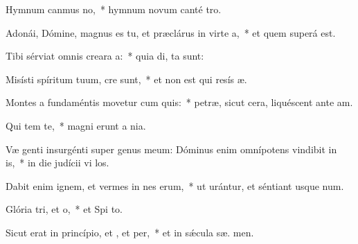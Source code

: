 \item Hymnum canmus no,~* hymnum novum canté  tro.
\item Adonái, Dómine, magnus es tu, et præclárus in virte a,~* et quem superá  est.
\item Tibi sérviat omnis creara a:~* quia di,  ta sunt:
\item Misísti spíritum tuum,  cre sunt,~* et non est qui resís  æ.
\item Montes a fundaméntis movetur cum quis:~* petræ, sicut cera, liquéscent ante  am.
\item Qui tem  te,~* magni erunt a   nia.
\item Væ genti insurgénti super genus meum: Dóminus enim omnípotens vindibit in is,~* in die judícii vi los.
\item Dabit enim ignem, et vermes in nes erum,~* ut urántur, et séntiant usque  num.
\item Glória tri, et o,~* et Spi to.
\item Sicut erat in princípio, et , et per,~* et in sǽcula sæ. men.
